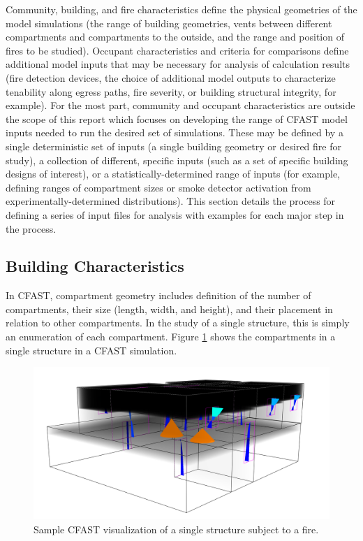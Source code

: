 \documentclass[12pt,twoside]{book}
\begin{document}
Community, building, and fire characteristics define the physical geometries of the model simulations (the range of building geometries, vents between different compartments and compartments to the outside, and the range and position of fires to be studied). Occupant characteristics and criteria for comparisons define additional model inputs that may be necessary for analysis of calculation results (fire detection devices, the choice of additional model outputs to characterize tenability along egress paths, fire severity, or building structural integrity, for example). For the most part, community and occupant characteristics are outside the scope of this report which focuses on developing the range of CFAST model inputs needed to run the desired set of simulations. These may be defined by a single deterministic set of inputs (a single building geometry or desired fire for study), a collection of different, specific inputs (such as a set of specific building designs of interest), or a statistically-determined range of inputs (for example, defining ranges of compartment sizes or smoke detector activation from experimentally-determined distributions). This section details the process for defining a series of input files for analysis with examples for each major step in the process.

\subsection{Building Characteristics}

In CFAST, compartment geometry includes definition of the number of compartments, their size (length, width, and height), and their placement in relation to other compartments. In the study of a single structure, this is simply an enumeration of each compartment. Figure \ref{sample_visualization} shows the compartments in a single structure in a CFAST simulation.

\begin{figure}[h!]
\centering
\includegraphics[width=4.5in]{FIGURES/Sample_Visualization.png}
\caption{Sample CFAST visualization of a single structure subject to a fire.}
\label{sample_visualization}
\end{figure}
\end{document}

